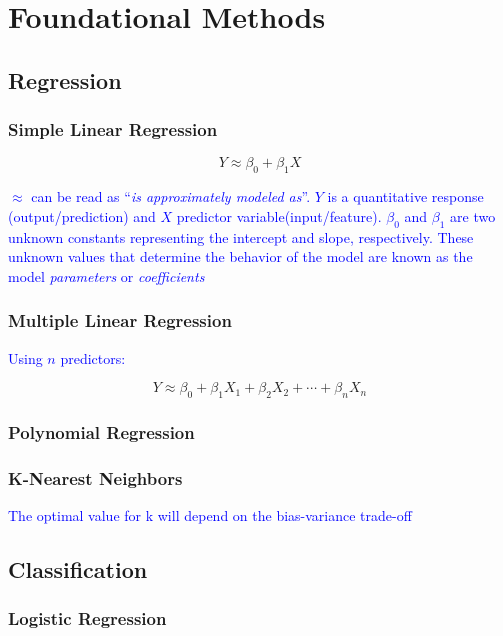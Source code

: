 \chapter{Foundational Methods}

\section{Regression}

\subsection{Simple Linear Regression}


\begin{equation}
{Y \approx \beta_0 + \beta_1 X}
\label{eq:slr_ex}
\end{equation}

\textcolor{blue}{$\approx$ can be read as ``\emph{is approximately modeled as}''. $Y$ is a quantitative response (output/prediction) and $X$ predictor variable(input/feature). $\beta_0$ and $\beta_1$ are two unknown constants representing the intercept and slope, respectively. These unknown values that determine the behavior of the model are known as the model \emph{parameters} or \emph{coefficients}}


\subsection{Multiple Linear Regression}

\textcolor{blue}{Using $n$ predictors:}

\begin{equation}
{Y \approx \beta_0 + \beta_1 X_1 + \beta_2 X_2 + \cdots + \beta_n X_n}
\label{eq:mlr_ex}
\end{equation}


\subsection{Polynomial Regression}



\subsection{K-Nearest Neighbors}

\textcolor{blue}{The optimal value for k will depend on the bias-variance trade-off}

\section{Classification}

\subsection{Logistic Regression}

